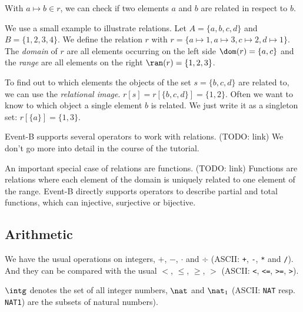 With $a\mapsto b\in r$, we can check if two elements $a$ and $b$ are related in respect to $b$.

We use a small example to illustrate relations. Let $A = \{a,b,c,d\}$ and $B=\{1,2,3,4\}$.
We define the relation $r$ with $r = \{a\mapsto 1, a\mapsto 3, c\mapsto 2, d\mapsto 1\}$.
The \emph{domain} of $r$ are all elements occurring on the left side $\dom(r) = \{a,c\}$ and the
\emph{range} are all elements on the right $\ran(r)=\{1,2,3\}$.

To find out to which elements the objects of the set $s=\{b,c,d\}$ are related to, we can use the \emph{relational image}.
$r[s] = r[\{b,c,d\}] = \{1,2\}$.
Often we want to know to which object a single element $b$ is related. We just write it as a singleton
set: $r[\{a\}] = \{1,3\}$.

Event-B supports several operators to work with relations. (TODO: link)
We don't go more into detail in the course of the tutorial.

An important special case of relations are functions. (TODO: link) Functions are relations where each element of the
domain is uniquely related to one element of the range. Event-B directly supports operators to describe
partial and total functions, which can injective, surjective or bijective.

\subsection{Arithmetic}
\label{tut:arithmetic}
We have the usual operations on integers, $+$, $-$, $\cdot$ and $\div$ (ASCII: \texttt{+}, \texttt{-},
\texttt{*} and \texttt{/}). And they can be compared with the usual $<$, $\leq$, $\geq$, $>$ (ASCII: \texttt{<}, \texttt{<=}, \texttt{>=}, \texttt{>}).

$\intg$  denotes the set of all integer numbers, $\nat$ and $\nat_1$ (ASCII: \texttt{NAT} resp. 
\texttt{NAT1}) are the subsets of natural numbers).


